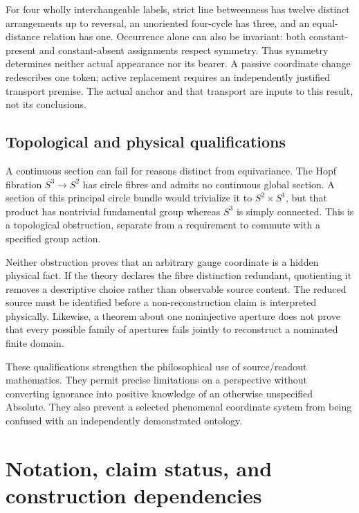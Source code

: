 For four wholly interchangeable labels, strict line betweenness has twelve distinct arrangements up to reversal, an unoriented four-cycle has three, and an equal-distance relation has one. Occurrence alone can also be invariant: both constant-present and constant-absent assignments respect symmetry. Thus symmetry determines neither actual appearance nor its bearer. A passive coordinate change redescribes one token; active replacement requires an independently justified transport premise. The actual anchor and that transport are inputs to this result, not its conclusions.

\section{Topological and physical qualifications}\label{section:reconstruction:topological-and-physical-qualifications}
A continuous section can fail for reasons distinct from equivariance. The Hopf fibration $S^3\to S^2$ has circle fibres and admits no continuous global section. A section of this principal circle bundle would trivialize it to $S^2\times S^1$, but that product has nontrivial fundamental group whereas $S^3$ is simply connected. This is a topological obstruction, separate from a requirement to commute with a specified group action.

Neither obstruction proves that an arbitrary gauge coordinate is a hidden physical fact. If the theory declares the fibre distinction redundant, quotienting it removes a descriptive choice rather than observable source content. The reduced source must be identified before a non-reconstruction claim is interpreted physically. Likewise, a theorem about one noninjective aperture does not prove that every possible family of apertures fails jointly to reconstruct a nominated finite domain.

These qualifications strengthen the philosophical use of source/readout mathematics. They permit precise limitations on a perspective without converting ignorance into positive knowledge of an otherwise unspecified Absolute. They also prevent a selected phenomenal coordinate system from being confused with an independently demonstrated ontology.

\chapter{Notation, claim status, and construction dependencies}\label{app:ledger}
